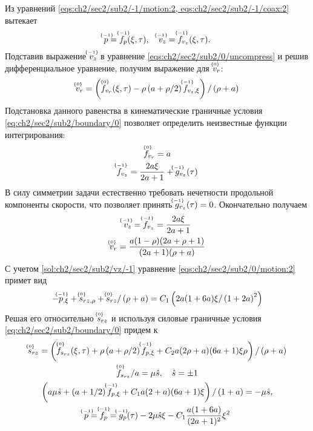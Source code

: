 Из уравнений \cref{eqs:ch2/sec2/sub2/-1/motion:2, eqs:ch2/sec2/sub2/-1/coax:2} вытекает
\begin{equation*}
  \uindex{p}{-1} = \uindex{f}{-1}_{p}(\xi, \tau), \quad \uindex{v}{-1}_{z} = \uindex{f}{-1}_{v_{z}}(\xi, \tau).
\end{equation*}
Подставив выражение $\uindex{v}{-1}_{z}$ в уравнение \cref{eqs:ch2/sec2/sub2/0/uncompress} и решив дифференциальное уравнение, получим выражение для $\uindex{v}{0}_{r}$:
\begin{equation*}
  \uindex{v}{0}_{r} = \left(\uindex{f}{0}_{v_{r}}(\xi, \tau) -\rho \left(a+\rho/2\right) \uindex{f}{-1}_{v_{z},\xi}\right) / \left(\rho+a\right)
\end{equation*}
Подстановка данного равенства в кинематические граничные условия \cref{eq:ch2/sec2/sub2/boundary/0} позволяет определить неизвестные функции интегрирования:
\begin{gather*}
  \uindex{f}{0}_{v_{r}} = a\\
  \uindex{f}{-1}_{v_{z}} = \frac{2a\xi}{2a+1} + \uindex{g}{-1}_{v_{z}}(\tau)
\end{gather*}
В силу симметрии задачи естественно требовать нечетности продольной компоненты скорости, что позволяет принять $\uindex{g}{-1}_{v_{z}}(\tau) = 0$. Окончательно получаем
\begin{gather}
  \label{sol:ch2/sec2/sub2/vz/-1}
  \uindex{v}{-1}_{z} = \uindex{f}{-1}_{v_{z}} = \frac{2a\xi}{2a+1}
  \\
  \label{sol:ch2/sec2/sub2/vr/0}
  \uindex{v}{0}_{r} =  \frac{a(1-\rho)(2a+\rho+1)}{(2a+1)(\rho+a)}
\end{gather}
С учетом \cref{sol:ch2/sec2/sub2/vz/-1} уравнение \cref{eqs:ch2/sec2/sub2/0/motion:2} примет вид
\begin{equation*}
  -\uindex{p}{-1}_{,\xi} + \uindex{s}{0}_{rz,\rho} + \uindex{s}{0}_{rz} / \left(\rho+a\right) = C_1 \left(2a(1+6a)\xi/\left(1+2a\right)^2\right)
\end{equation*}
Решая его относительно $\uindex{s}{0}_{rz}$ и используя силовые граничные условия \cref{eq:ch2/sec2/sub2/boundary/0} придем к
\begin{gather*}
  \uindex{s}{0}_{rz} = \left(\uindex{f}{0}_{s_{rz}}(\xi, \tau) + \rho \left(a+\rho/2\right) \uindex{f}{-1}_{p,\xi} + C_2 a(2\rho+a)(6a+1)\xi\rho\right) / \left(\rho+a\right)
  \\
  \uindex{f}{0}_{s_{rz}} / a = \mu\hat{s}, \quad \hat{s} = \pm 1
  \\
  \left(a \mu\hat{s} + \left(a+1/2\right) \uindex{f}{-1}_{p,\xi} + C_1 a(2+a)(6a+1)\xi\right) / \left(1+a\right) = -\mu \hat{s},
  \\
  \uindex{p}{-1}=\uindex{f}{-1}_{p} =\uindex{g}{-1}_{p}(\tau) -2\mu\hat{s}\xi - C_1 \frac{a(1+6a)}{(2a+1)^2}\xi^2
\end{gather*}
